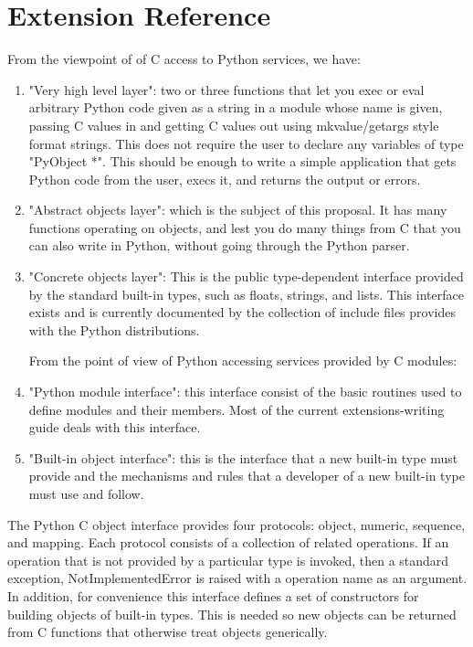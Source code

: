 \newcommand{\NULL}{\code{NULL}}

\chapter{Extension Reference}

From the viewpoint of of C access to Python services, we have:

\begin{enumerate}
  \item "Very high level layer": two or three functions that let you exec or
    eval arbitrary Python code given as a string in a module whose name is
    given, passing C values in and getting C values out using
    mkvalue/getargs style format strings.  This does not require the user
    to declare any variables of type "PyObject *".  This should be enough
    to write a simple application that gets Python code from the user,
    execs it, and returns the output or errors.

  \item "Abstract objects layer": which is the subject of this proposal.
    It has many functions operating on objects, and lest you do many
    things from C that you can also write in Python, without going
    through the Python parser.

  \item "Concrete objects layer": This is the public type-dependent
    interface provided by the standard built-in types, such as floats,
    strings, and lists.  This interface exists and is currently
    documented by the collection of include files provides with the
    Python distributions.

  From the point of view of Python accessing services provided by C
  modules: 

  \item "Python module interface": this interface consist of the basic
    routines used to define modules and their members.  Most of the
    current extensions-writing guide deals with this interface.

  \item "Built-in object interface": this is the interface that a new
    built-in type must provide and the mechanisms and rules that a
    developer of a new built-in type must use and follow.
\end{enumerate}

  The Python C object interface provides four protocols: object,
  numeric, sequence, and mapping.  Each protocol consists of a
  collection of related operations.  If an operation that is not
  provided by a particular type is invoked, then a standard exception,
  NotImplementedError is raised with a operation name as an argument.
  In addition, for convenience this interface defines a set of
  constructors for building objects of built-in types.  This is needed
  so new objects can be returned from C functions that otherwise treat
  objects generically.

